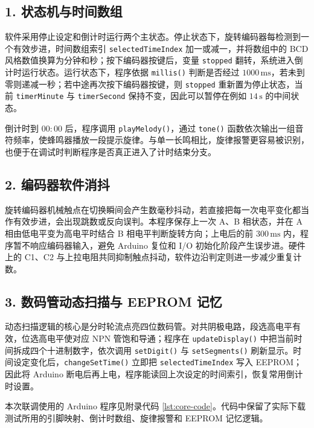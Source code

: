 \documentclass[UTF8,a4paper,12pt]{ctexart}
\newcounter{makepart}
\begin{document}

\subsection*{1. 状态机与时间数组}

软件采用停止设定和倒计时运行两个主状态。停止状态下，旋转编码器每检测到一个有效步进，时间数组索引 \texttt{selectedTimeIndex} 加一或减一，并将数组中的 BCD 风格数值换算为分钟和秒；按下编码器按键后，变量 \texttt{stopped} 翻转，系统进入倒计时运行状态。运行状态下，程序依据 \texttt{millis()} 判断是否经过 $1000\,\mathrm{ms}$，若未到零则递减一秒；若中途再次按下编码器按键，则 \texttt{stopped} 重新置为停止状态，当前 \texttt{timerMinute} 与 \texttt{timerSecond} 保持不变，因此可以暂停在例如 $14\,\mathrm{s}$ 的中间状态。

倒计时到 $00:00$ 后，程序调用 \texttt{playMelody()}，通过 \texttt{tone()} 函数依次输出一组音符频率，使蜂鸣器播放一段提示旋律。与单一长鸣相比，旋律报警更容易被识别，也便于在调试时判断程序是否真正进入了计时结束分支。

\subsection*{2. 编码器软件消抖}

旋转编码器机械触点在切换瞬间会产生数毫秒抖动，若直接把每一次电平变化都当作有效步进，会出现跳数或反向误判。本程序保存上一次 A、B 相状态，并在 A 相由低电平变为高电平时结合 B 相电平判断旋转方向；上电后的前 $300\,\mathrm{ms}$ 内，程序暂不响应编码器输入，避免 Arduino 复位和 I/O 初始化阶段产生误步进。硬件上的 C1、C2 与上拉电阻共同抑制触点抖动，软件边沿判定则进一步减少重复计数。

\subsection*{3. 数码管动态扫描与 EEPROM 记忆}

动态扫描逻辑的核心是分时轮流点亮四位数码管。对共阴极电路，段选高电平有效，位选高电平使对应 NPN 管饱和导通；程序在 \texttt{updateDisplay()} 中把当前时间拆成四个十进制数字，依次调用 \texttt{setDigit()} 与 \texttt{setSegments()} 刷新显示。时间设定变化后，\texttt{changeSetTime()} 立即把 \texttt{selectedTimeIndex} 写入 EEPROM；因此将 Arduino 断电后再上电，程序能读回上次设定的时间索引，恢复常用倒计时设置。

本次联调使用的 Arduino 程序见附录代码 \ref{lst:core-code}。代码中保留了实际下载测试所用的引脚映射、倒计时数组、旋律报警和 EEPROM 记忆逻辑。
\end{document}
